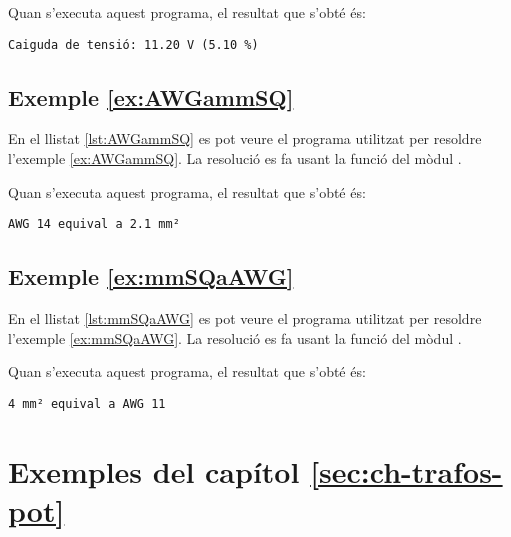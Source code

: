 Quan s'executa aquest programa, el resultat que s'obté és:
\lstset{
	language=,
	numbers=none,
	frame=none
}
\begin{lstlisting}
Caiguda de tensió: 11.20 V (5.10 %)
\end{lstlisting} 



\hypertarget{exemple:AWGammSQ}{\subsection{Exemple \ref*{ex:AWGammSQ} \AWGammSQ}}
En el llistat \vref{lst:AWGammSQ} es pot veure el programa utilitzat per resoldre l'exemple \vref{ex:AWGammSQ}. La resolució es fa usant la funció  del mòdul .


Quan s'executa aquest programa, el resultat que s'obté és:
\lstset{
	language=,
	numbers=none,
	frame=none
}
\begin{lstlisting}
AWG 14 equival a 2.1 mm²
\end{lstlisting} 



\hypertarget{exemple:mmSQaAWG}{\subsection{Exemple \ref*{ex:mmSQaAWG} \mmSQaAWG}}
En el llistat \vref{lst:mmSQaAWG} es pot veure el programa utilitzat per resoldre l'exemple \vref{ex:mmSQaAWG}. La resolució es fa usant la funció  del mòdul .


Quan s'executa aquest programa, el resultat que s'obté és:
\lstset{
	language=,
	numbers=none,
	frame=none
}
\begin{lstlisting}
4 mm² equival a AWG 11
\end{lstlisting} 





\section{Exemples del capítol \ref*{sec:ch-trafos-pot}}

